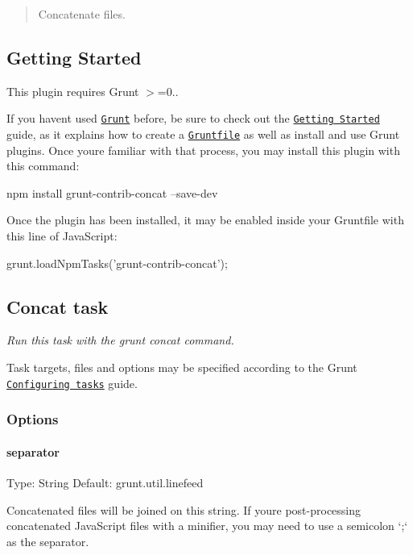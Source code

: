 \begin{quote}
Concatenate files. \end{quote}


\subsection*{Getting Started}

This plugin requires Grunt {\ttfamily $>$=0..}

If you haven\textquotesingle{}t used \href{http://gruntjs.com/}{\tt Grunt} before, be sure to check out the \href{http://gruntjs.com/getting-started}{\tt Getting Started} guide, as it explains how to create a \href{http://gruntjs.com/sample-gruntfile}{\tt Gruntfile} as well as install and use Grunt plugins. Once you\textquotesingle{}re familiar with that process, you may install this plugin with this command\+:


\begin{DoxyCode}
npm install grunt-contrib-concat --save-dev
\end{DoxyCode}


Once the plugin has been installed, it may be enabled inside your Gruntfile with this line of Java\+Script\+:


\begin{DoxyCode}
grunt.loadNpmTasks('grunt-contrib-concat');
\end{DoxyCode}


\subsection*{Concat task}

{\itshape Run this task with the {\ttfamily grunt concat} command.}

Task targets, files and options may be specified according to the Grunt \href{http://gruntjs.com/configuring-tasks}{\tt Configuring tasks} guide.

\subsubsection*{Options}

\paragraph*{separator}

Type\+: {\ttfamily String} Default\+: {\ttfamily grunt.\+util.\+linefeed}

Concatenated files will be joined on this string. If you\textquotesingle{}re post-\/processing concatenated Java\+Script files with a minifier, you may need to use a semicolon `\textquotesingle{};\textquotesingle{}` as the separator.

